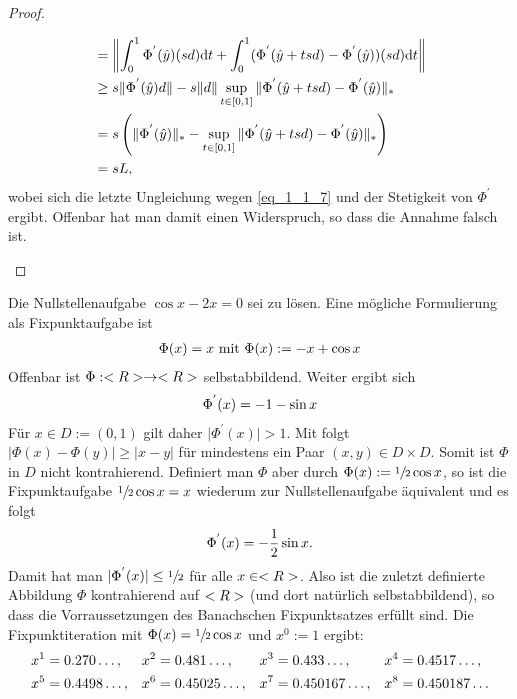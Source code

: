 \begin{proof}
\begin{enumerate}
\begin{align}
			&= \left\Vert \int_{0}^{1} \Phi^{'}(\hat{y})(sd)\mathrm{d}t + \int_{0}^{1} (\Phi^{'}(\hat{y}+tsd) - \Phi^{'}(\hat{y}))(sd) \mathrm{d}t \right\Vert\notag \\
			&\ge s \Vert \Phi^{'}(\hat{y})d \Vert - s \Vert d \Vert \sup_{t \in [0,1]}\Vert\Phi^{'}(\hat{y} + tsd) - \Phi^{'}(\hat{y})\Vert_{\ast} \notag \\
			&= s \left( \Vert \Phi^{'}(\hat{y}) \Vert_{\ast} - \sup_{t \in [0,1]}\Vert\Phi^{'}(\hat{y} + tsd) - \Phi^{'}(\hat{y})\Vert_{\ast} \right) \notag\\
			&= sL, \notag
		\end{align}
		wobei sich die letzte Ungleichung wegen \ref{eq_1_1_7} und der Stetigkeit von $\Phi^{'}$ ergibt. Offenbar hat man damit einen Widerspruch, so dass die Annahme falsch ist.
	\end{enumerate}
\end{proof}

\begin{example}
	Die Nullstellenaufgabe $\cos x - 2x = 0$ sei zu lösen. Eine mögliche Formulierung als Fixpunktaufgabe ist
	\begin{align}
		\Phi(x) = x \text{   mit  } \Phi(x) := -x + \cos x \notag
	\end{align}
	Offenbar ist $\Phi: <R> \to <R>$ selbstabbildend. Weiter ergibt sich
	\begin{align}
		\Phi^{'}(x) = -1 - \sin x \notag
	\end{align}
	Für $x \in D := (0,1)$ gilt daher $\vert \Phi^{'} (x)\vert > 1$. Mit  folgt $\vert \Phi(x) - \Phi(y)\vert \ge \vert x-y\vert$ für mindestens ein Paar $(x,y) \in D \times D$. Somit ist $\Phi$ in $D$ nicht kontrahierend.
	Definiert man $\Phi$ aber durch $\Phi(x) := \sfrac{1}{2}\cos x$, so ist die Fixpunktaufgabe $\sfrac{1}{2}\cos x = x$ wiederum zur Nullstellenaufgabe äquivalent und es folgt
	\begin{align}
		\Phi^{'}(x) = - \frac{1}{2}\sin x. \notag
	\end{align} 
	Damit hat man $\vert \Phi^{'}(x)\vert \le \sfrac{1}{2}$ für alle $x \in <R>$. Also ist die zuletzt definierte Abbildung $\Phi$ kontrahierend auf $<R>$ (und dort natürlich selbstabbildend), so dass die Vorraussetzungen des Banachschen Fixpunktsatzes erfüllt sind. Die Fixpunktiteration mit $\Phi(x) = \sfrac{1}{2}\cos x$ und $x^0 := 1$ ergibt:
	\begin{align}
        x^1 &= 0.270\dots,  & x^2 &= 0.481\dots,   & x^3 &= 0.433\dots,    & x^4 &= 0.4517\dots, \notag \\
        x^5 &= 0.4498\dots, & x^6 &= 0.45025\dots, & x^7 &= 0.450167\dots, & x^8 &= 0.450187\dots \notag
	\end{align}
\end{example}

